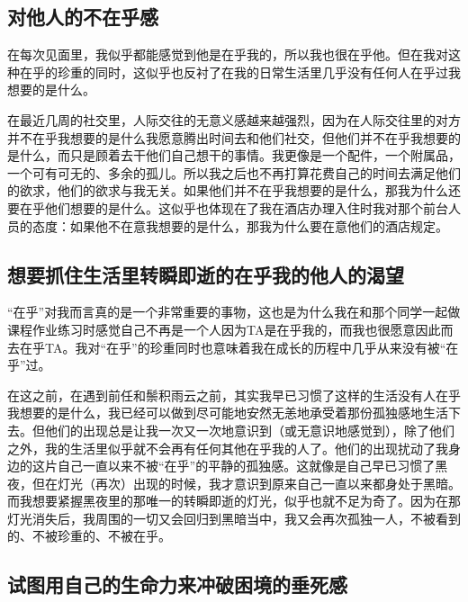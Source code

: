 


\subsection*{对他人的不在乎感}

在每次见面里，我似乎都能感觉到他是在乎我的，所以我也很在乎他。但在我对这种在乎的珍重的同时，这似乎也反衬了在我的日常生活里几乎没有任何人在乎过我想要的是什么。

在最近几周的社交里，人际交往的无意义感越来越强烈，因为在人际交往里的对方并不在乎我想要的是什么\pozhehao{}我愿意腾出时间去和他们社交，但他们并不在乎我想要的是什么，而只是顾着去干他们自己想干的事情。我更像是一个配件，一个附属品，一个可有可无的、多余的孤儿。所以我之后也不再打算花费自己的时间去满足他们的欲求，他们的欲求与我无关。如果他们并不在乎我想要的是什么，那我为什么还要在乎他们想要的是什么。这似乎也体现在了我在酒店办理入住时我对那个前台人员的态度：如果他不在意我想要的是什么，那我为什么要在意他们的酒店规定。




\subsection*{想要抓住生活里转瞬即逝的在乎我的他人的渴望}

“在乎”对我而言真的是一个非常重要的事物，这也是为什么我在和那个同学一起做课程作业练习时感觉自己不再是一个人\pozhehao{}因为TA是在乎我的，而我也很愿意因此而去在乎TA。我对“在乎”的珍重同时也意味着我在成长的历程中几乎从来没有被“在乎”过。

在这之前，在遇到前任和鬃积雨云之前，其实我早已习惯了这样的生活\pozhehao{}没有人在乎我想要的是什么，我已经可以做到尽可能地安然无恙地承受着那份孤独感地生活下去。但他们的出现总是让我一次又一次地意识到（或无意识地感觉到），除了他们之外，我的生活里似乎就不会再有任何其他在乎我的人了。他们的出现扰动了我身边的这片自己一直以来不被“在乎”的平静的孤独感。这就像是自己早已习惯了黑夜，但在灯光（再次）出现的时候，我才意识到原来自己一直以来都身处于黑暗。而我想要紧握黑夜里的那唯一的转瞬即逝的灯光，似乎也就不足为奇了。因为在那灯光消失后，我周围的一切又会回归到黑暗当中，我又会再次孤独一人，不被看到的、不被珍重的、不被在乎。




\subsection*{试图用自己的生命力来冲破困境的垂死感}

